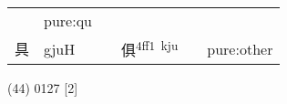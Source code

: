 \documentclass[14pt,a4paper]{scrartcl}
\begin{document}
\begin{longtable}[c]{@{}llllll@{}}
\begin{minipage}[t]{0.14\columnwidth}\raggedright\strut
\strut\end{minipage} &
\begin{minipage}[t]{0.14\columnwidth}\raggedright\strut
pure:qu
\strut\end{minipage}\tabularnewline
\begin{minipage}[t]{0.14\columnwidth}\raggedright\strut
具
\strut\end{minipage} &
\begin{minipage}[t]{0.14\columnwidth}\raggedright\strut
gjuH
\strut\end{minipage} &
\begin{minipage}[t]{0.14\columnwidth}\raggedright\strut
\strut\end{minipage} &
\begin{minipage}[t]{0.14\columnwidth}\raggedright\strut
俱\textsuperscript{4ff1~kju}
\strut\end{minipage} &
\begin{minipage}[t]{0.14\columnwidth}\raggedright\strut
\strut\end{minipage} &
\begin{minipage}[t]{0.14\columnwidth}\raggedright\strut
pure:other
\strut\end{minipage}\tabularnewline
\bottomrule
\end{longtable}

(44) 0127 {[}2{]}
\end{document}
